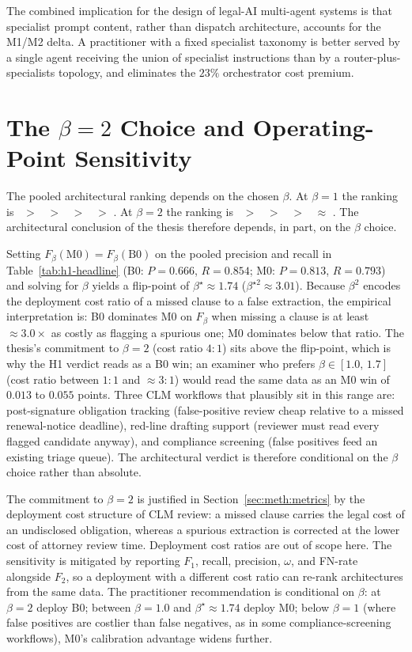 The combined implication for the design of legal-AI multi-agent systems is
that specialist prompt content, rather than dispatch architecture, accounts
for the M1/M2 delta. A practitioner with a fixed specialist taxonomy is
better served by a single agent receiving the union of specialist
instructions than by a router-plus-specialists topology, and eliminates
the $23\%$ orchestrator cost premium.

\section{The $\beta{=}2$ Choice and Operating-Point Sensitivity}\label{sec:disc:metric}

The pooled architectural ranking depends on the chosen $\beta$. At
$\beta{=}1$ the ranking is \cfgCX\ $>$ \cfgMA\ $>$ \cfgZS\ $>$ \cfgCP\ $>$ \cfgCoT.
At $\beta{=}2$ the ranking is \cfgZS\ $>$ \cfgCoT\ $>$ \cfgCX\ $>$ \cfgMA\ $\approx$ \cfgCP. The architectural
conclusion of the thesis therefore depends, in part, on the $\beta$ choice.

Setting $F_\beta(\text{M0}) = F_\beta(\text{B0})$ on the pooled precision and
recall in Table~\ref{tab:h1-headline} (B0: $P{=}0.666$, $R{=}0.854$; M0:
$P{=}0.813$, $R{=}0.793$) and solving for $\beta$ yields a flip-point of
$\beta^\star \approx 1.74$ ($\beta^{\star 2} \approx 3.01$). Because $\beta^2$
encodes the deployment cost ratio of a missed clause to a false extraction,
the empirical interpretation is: B0 dominates M0 on $F_\beta$ when missing a
clause is at least $\approx\!3.0\times$ as costly as flagging a spurious one;
M0 dominates below that ratio. The thesis's commitment to $\beta{=}2$ (cost
ratio $4{:}1$) sits above the flip-point, which is why the H1 verdict reads
as a B0 win; an examiner who prefers $\beta \in [1.0,\,1.7]$ (cost ratio
between $1{:}1$ and $\approx\!3{:}1$) would read the same data as an M0 win
of $0.013$ to $0.055$ points. Three CLM workflows that plausibly sit in this
range are: post-signature obligation tracking (false-positive review cheap
relative to a missed renewal-notice deadline), red-line drafting support
(reviewer must read every flagged candidate anyway), and compliance
screening (false positives feed an existing triage queue). The architectural
verdict is therefore conditional on the $\beta$ choice rather than absolute.

The commitment to $\beta{=}2$ is justified in
Section~\ref{sec:meth:metrics} by the deployment cost structure of CLM
review: a missed clause carries the legal cost of an undisclosed obligation,
whereas a spurious extraction is corrected at the lower cost of attorney
review time. Deployment cost ratios are out of scope here. The
sensitivity is mitigated by reporting $F_1$, recall, precision, $\omega$,
and FN-rate alongside $F_2$, so a deployment with a different cost ratio can
re-rank architectures from the same data. The practitioner recommendation is
conditional on $\beta$: at $\beta{=}2$ deploy B0; between $\beta{=}1.0$ and
$\beta^\star{\approx}1.74$ deploy M0; below $\beta{=}1$ (where false
positives are costlier than false negatives, as in some compliance-screening
workflows), M0's calibration advantage widens further.


